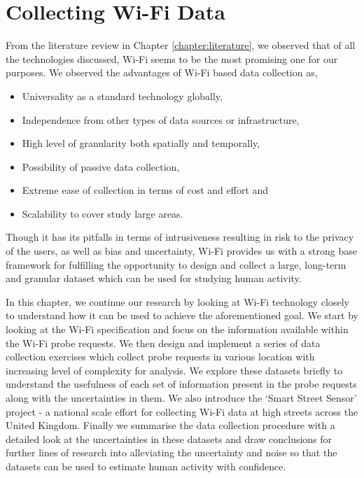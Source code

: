 \chapter{Collecting Wi-Fi Data}\label{chapter:collection}

From the literature review in Chapter \ref{chapter:literature}, we observed that  of all the technologies discussed, Wi-Fi seems to be the most promising one for our purposes.
We observed the advantages of Wi-Fi based data collection as,

\begin{itemize}[rightmargin=2em, leftmargin=2em]
  \itemsep-0.25em
  \item Universality as a standard technology globally,
  \item Independence from other types of data sources or infrastructure,
  \item High level of granularity both spatially and temporally,
  \item Possibility of passive data collection,
  \item Extreme ease of collection in terms of cost and effort and
  \item Scalability to cover study large areas.
\end{itemize}

Though it has its pitfalls in terms of intrusiveness resulting in risk to the privacy of the users, as well as bias and uncertainty, Wi-Fi provides us with a strong base framework for fulfilling the opportunity to design and collect a large, long-term and granular dataset which can be used for studying human activity.

In this chapter, we continue our research by looking at Wi-Fi technology closely to understand how it can be used to achieve the aforementioned goal.
We start by looking at the Wi-Fi specification \cite{ieee2016} and focus on the information available within the Wi-Fi probe requests.
We then design and implement a series of data collection exercises which collect probe requests in various location with increasing level of complexity for analysis.
We explore these datasets briefly to understand the usefulness of each set of information present in the probe requests along with the uncertainties in them.
We also introduce the `Smart Street Sensor' project - a national scale effort for collecting Wi-Fi data at high streets across the United Kingdom.
Finally we summarise the data collection procedure with a detailed look at the uncertainties in these datasets and draw conclusions for further lines of research into alleviating the uncertainty and noise so that the datasets can be used to estimate human activity with confidence.

